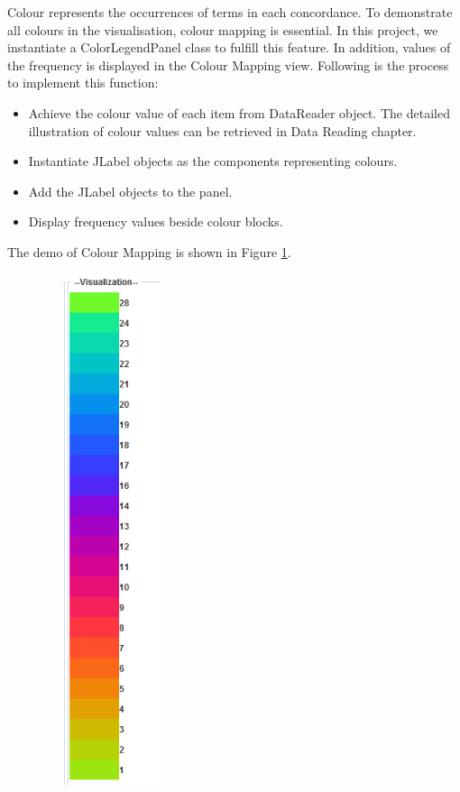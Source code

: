 Colour represents the occurrences of terms in each concordance. To demonstrate all colours in the visualisation, colour mapping is essential. In this project, we instantiate a ColorLegendPanel class to fulfill this feature. In addition, values of the frequency is displayed in the Colour Mapping view. Following is the process to implement this function: 
\begin{itemize}
	\item \textbf{} Achieve the colour value of each item from DataReader object. The detailed illustration of colour values can be retrieved in Data Reading chapter.
	\item \textbf{} Instantiate JLabel objects as the components representing colours.
	\item \textbf{} Add the JLabel objects to the panel.
	\item \textbf{} Display frequency values beside colour blocks.
\end{itemize}

The demo of Colour Mapping is shown in Figure \ref{fig:colourMapping}.
\begin{figure}[H]
	\centering	
	\includegraphics[width=4cm, height=15cm]{Figs/Color-Mapping}\\[1ex]
	\caption{}
	\label{fig:colourMapping}
\end{figure} 

